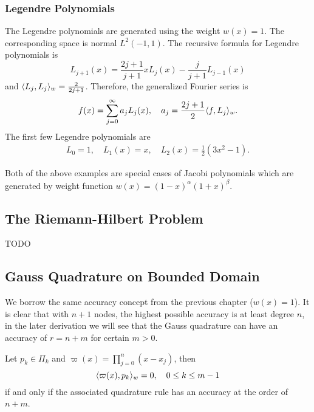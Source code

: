 \subsubsection{Legendre Polynomials}
\label{SSSec: 3-Leg-Pol}
The Legendre polynomials are generated using the weight $w(x) = 1$. The corresponding space is normal $L^2(-1,1)$. The recursive formula for Legendre polynomials is 
\begin{equation}
    L_{j+1}(x) = \frac{2j+1}{j+1} x L_j(x) - \frac{j}{j+1} L_{j-1}(x)
\end{equation}
and $\langle {L_j, L_j} \rangle_w = \frac{2}{2j+1}$. Therefore, the generalized Fourier series is 
\begin{equation}
    f(x) = \sum_{j=0}^{\infty} a_j L_j(x),\quad a_j =  \frac{2j+1}{2}\langle {f, L_j} \rangle_w.
\end{equation}
The first few Legendre polynomials are 
    \begin{equation}
        \begin{aligned}
            L_0 = 1, \quad L_1(x) = x,\quad L_2(x) = \frac{1}{2}(3x^2 - 1).
        \end{aligned}
    \end{equation}
\begin{remark}
    Both of the above examples are special cases of Jacobi polynomials which are generated by weight function $w(x) = (1 - x)^{\alpha}(1 + x)^{\beta}$. 
\end{remark}
\subsection{The Riemann-Hilbert Problem}
\label{SSec: 3-Rie-Hil-Pro}
TODO
\subsection{Gauss Quadrature on Bounded Domain}
\label{SSec: 3-Gau-Qua-Bou-Dom}
We borrow the same accuracy concept from the previous chapter ($w(x) = 1$). It is clear that with $n+1$ nodes, the highest possible accuracy is at least degree $n$, in the later derivation we will see that the Gauss quadrature can have an accuracy of $r = n + m$ for certain $ m > 0$.

\begin{theorem}
\label{Thm: 3-GAU-ACC}
Let $p_k\in \Pi_k$ and ${\varpi}(x) = \prod_{j=0}^{n}(x - x_j)$, then
    $$\langle {\varpi(x), p_{k}} \rangle_w = 0,\quad 0\le k\le {m-1}$$
    if and only if the associated quadrature rule has an accuracy at the order of $n + m$.
\end{theorem}

